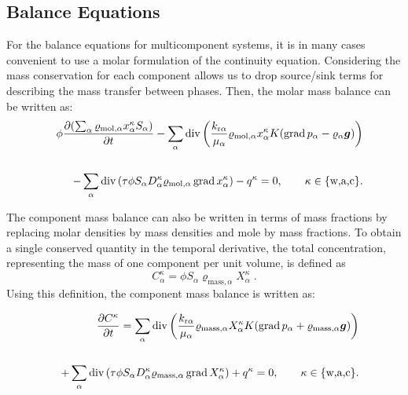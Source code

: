 \subsection{Balance Equations}
For the balance equations for multicomponent systems, it is in many
cases convenient to use a molar formulation of the continuity
equation. Considering the mass conservation for each component allows
us to drop source/sink terms for describing the mass transfer between
phases. Then, the
molar mass balance can be written as:
%
\begin{eqnarray}
  \label{A3:eqmass1}
  && \phi \frac{\partial (\sum_\alpha \varrho_{\text{mol}, \alpha}
    x_\alpha^\kappa S_\alpha )}{\partial t} \nonumber 
 - \sum\limits_\alpha \operatorname{div} \left( \frac{k_{\text{r}
        \alpha}}{\mu_\alpha} \varrho_{\text{mol}, \alpha}
    x_\alpha^\kappa K (\operatorname{grad} p_\alpha -
    \varrho_{\alpha} \boldsymbol{g}) \right) \nonumber \\
  \nonumber \\
  && - \sum\limits_\alpha \operatorname{div} \left( \tau \phi S_\alpha D_\alpha^\kappa \varrho_{\text{mol},
      \alpha} \operatorname{grad} x_\alpha^\kappa \right) \nonumber 
 - q^\kappa = 0, \qquad \kappa \in \{\text{w,a,c}\}.
\end{eqnarray}

The component mass balance can also be written in terms of mass fractions 
by replacing molar densities by mass densities and mole by mass fractions.
To obtain a single conserved quantity in the temporal derivative, the total 
concentration, representing the mass of one component per unit volume, is defined as
\begin{displaymath}
C_\alpha^\kappa = \phi S_\alpha \varrho_{\text{mass},\alpha} X_\alpha^\kappa \; .
\end{displaymath}
Using this definition, the component mass balance is written as:

\begin{eqnarray}
  \label{A3:eqmass2}
  &&  \frac{\partial C^\kappa}{\partial t} = 
  \sum\limits_\alpha \operatorname{div} \left( \frac{k_{\text{r}
        \alpha}}{\mu_\alpha} \varrho_{\text{mass}, \alpha}
    X_\alpha^\kappa K (\operatorname{grad} p_\alpha +
    \varrho_{\text{mass}, \alpha} \boldsymbol{g}) \right) \nonumber \\
  \nonumber \\
  && + \sum\limits_\alpha \operatorname{div} \left( \tau \phi S_\alpha D_\alpha^\kappa \varrho_{\text{mass},
      \alpha} \operatorname{grad} X_\alpha^\kappa \right) \nonumber 
 + q^\kappa = 0, \qquad \kappa \in \{\text{w,a,c}\}.
\end{eqnarray}


